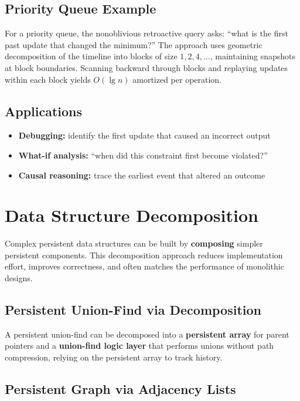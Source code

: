 \subsection{Priority Queue Example}

For a priority queue, the nonoblivious retroactive query asks: ``what is the first past update that changed the minimum?'' The approach uses geometric decomposition of the timeline into blocks of size $1, 2, 4, \ldots$, maintaining snapshots at block boundaries. Scanning backward through blocks and replaying updates within each block yields $O(\lg n)$ amortized per operation.

\subsection{Applications}

\begin{itemize}
    \item \textbf{Debugging:} identify the first update that caused an incorrect output
    \item \textbf{What-if analysis:} ``when did this constraint first become violated?''
    \item \textbf{Causal reasoning:} trace the earliest event that altered an outcome
\end{itemize}

\section{Data Structure Decomposition}
\label{sec21:decomposition}

Complex persistent data structures can be built by \textbf{composing} simpler persistent components. This decomposition approach reduces implementation effort, improves correctness, and often matches the performance of monolithic designs.

\subsection{Persistent Union-Find via Decomposition}

A persistent union-find can be decomposed into a \textbf{persistent array} for parent pointers and a \textbf{union-find logic layer} that performs unions without path compression, relying on the persistent array to track history.

\subsection{Persistent Graph via Adjacency Lists}

